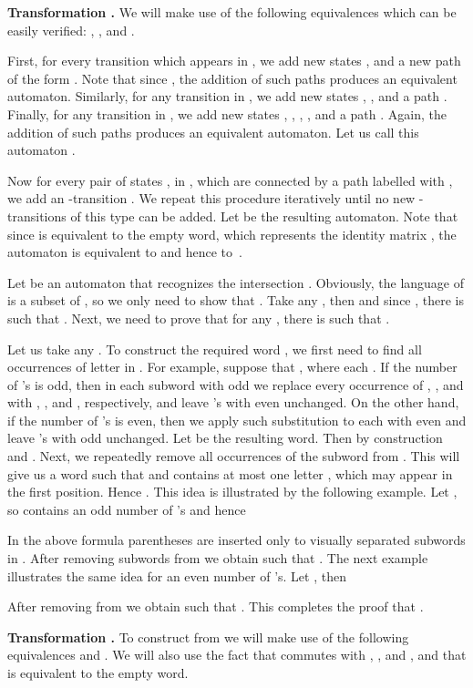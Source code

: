 \documentclass[fontsize=11pt,DIV=13,paper=letter]{scrartcl}
\theoremstyle{definition}
\begin{document}
{\bf Transformation .} We will make use of the following equivalences which can be easily verified: , , and .

First, for every transition  which appears in , we add new states ,  and a new path of the form . Note that since , the addition of such paths produces an equivalent automaton. Similarly, for any transition  in , we add new states , ,  and a path . Finally, for any transition  in , we add new states , , , ,  and a path . Again, the addition of such paths produces an equivalent automaton. Let us call this automaton .

Now for every pair of states ,  in , which are connected by a path labelled with , we add an -transition . We repeat this procedure iteratively until no new -transitions of this type can be added. Let  be the resulting automaton. Note that since  is equivalent to the empty word, which represents the identity matrix , the automaton  is equivalent to  and hence to~.

Let  be an automaton that recognizes the intersection . Obviously, the language of  is a subset of , so we only need to show that . Take any , then  and since , there is  such that . Next, we need to prove that for any , there is  such that .

Let us take any . To construct the required word , we first need to find all occurrences of letter  in . For example, suppose that , where each . If the number of 's is odd, then in each subword  with odd  we replace every occurrence of , , and  with , , and , respectively, and leave 's with even  unchanged. On the other hand, if the number of 's is even, then we apply such substitution to each  with even  and leave 's with odd  unchanged. Let  be the resulting word. Then by construction  and . Next, we repeatedly remove all occurrences of the subword  from . This will give us a word  such that  and  contains at most one letter , which may appear in the first position. Hence . This idea is illustrated by the following example. Let , so  contains an odd number of 's and hence

In the above formula parentheses are inserted only to visually separated subwords in . After removing subwords  from  we obtain  such that .
The next example illustrates the same idea for an even number of 's. Let , then

After removing  from  we obtain  such that . This completes the proof that .

{\bf Transformation .} To construct  from  we will make use of the following equivalences  and . We will also use the fact that  commutes with , , and , and that  is equivalent to the empty word.
\end{document}
